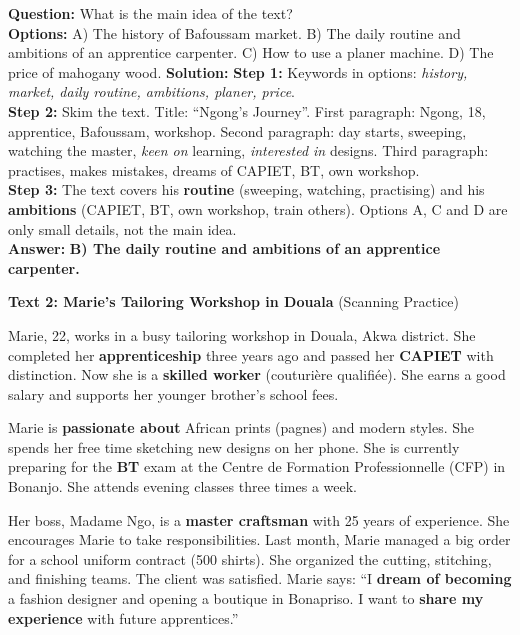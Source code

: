 \documentclass[11pt]{article}
\begin{document}
\begin{exoresolu}
\textbf{Question:} What is the main idea of the text? \\
\textbf{Options:}
A) The history of Bafoussam market.
B) The daily routine and ambitions of an apprentice carpenter.
C) How to use a planer machine.
D) The price of mahogany wood.
\tcblower
\textbf{Solution:}
\textbf{Step 1:} Keywords in options: \emph{history, market, daily routine, ambitions, planer, price}. \\
\textbf{Step 2:} Skim the text. Title: ``Ngong's Journey''. First paragraph: Ngong, 18, apprentice, Bafoussam, workshop. Second paragraph: day starts, sweeping, watching the master, \emph{keen on} learning, \emph{interested in} designs. Third paragraph: practises, makes mistakes, dreams of CAPIET, BT, own workshop. \\
\textbf{Step 3:} The text covers his \textbf{routine} (sweeping, watching, practising) and his \textbf{ambitions} (CAPIET, BT, own workshop, train others). Options A, C and D are only small details, not the main idea. \\
\textbf{Answer:} \textbf{B) The daily routine and ambitions of an apprentice carpenter.}
\end{exoresolu}

\textbf{Text 2: Marie's Tailoring Workshop in Douala} \hfill (Scanning Practice)

\begin{exemplebox}
Marie, 22, works in a busy tailoring workshop in Douala, Akwa district. She completed her \textbf{apprenticeship} three years ago and passed her \textbf{CAPIET} with distinction. Now she is a \textbf{skilled worker} (couturière qualifiée). She earns a good salary and supports her younger brother's school fees.

Marie is \textbf{passionate about} African prints (pagnes) and modern styles. She spends her free time sketching new designs on her phone. She is currently preparing for the \textbf{BT} exam at the Centre de Formation Professionnelle (CFP) in Bonanjo. She attends evening classes three times a week.

Her boss, Madame Ngo, is a \textbf{master craftsman} with 25 years of experience. She encourages Marie to take responsibilities. Last month, Marie managed a big order for a school uniform contract (500 shirts). She organized the cutting, stitching, and finishing teams. The client was satisfied. Marie says: ``I \textbf{dream of becoming} a fashion designer and opening a boutique in Bonapriso. I want to \textbf{share my experience} with future apprentices.''
\end{exemplebox}
\end{document}
